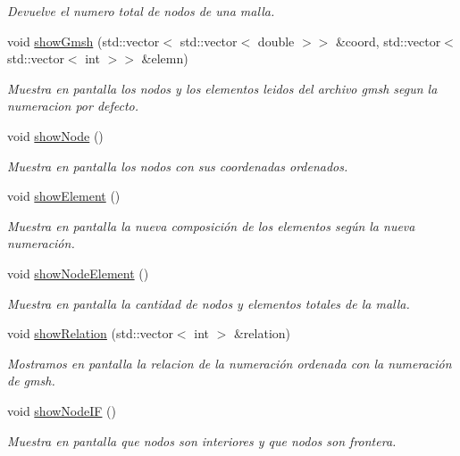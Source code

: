 \begin{DoxyCompactItemize}
\begin{DoxyCompactList}\small\item\em Devuelve el numero total de nodos de una malla. \end{DoxyCompactList}\item 
void \hyperlink{class_mesh_ab390b1e1292e0236b1a3d35c6b738228}{show\+Gmsh} (std\+::vector$<$ std\+::vector$<$ double $>$$>$ \&coord, std\+::vector$<$ std\+::vector$<$ int $>$$>$ \&elemn)
\begin{DoxyCompactList}\small\item\em Muestra en pantalla los nodos y los elementos leidos del archivo gmsh segun la numeracion por defecto. \end{DoxyCompactList}\item 
void \hyperlink{class_mesh_ac5eb1247da3ed432323f1dd8aebbf554}{show\+Node} ()
\begin{DoxyCompactList}\small\item\em Muestra en pantalla los nodos con sus coordenadas ordenados. \end{DoxyCompactList}\item 
void \hyperlink{class_mesh_a0d528aac55b1e4c2a6f5049f9d2cf90d}{show\+Element} ()
\begin{DoxyCompactList}\small\item\em Muestra en pantalla la nueva composición de los elementos según la nueva numeración. \end{DoxyCompactList}\item 
void \hyperlink{class_mesh_ac8d60f17c950dca8ef1a6288860bd3cb}{show\+Node\+Element} ()
\begin{DoxyCompactList}\small\item\em Muestra en pantalla la cantidad de nodos y elementos totales de la malla. \end{DoxyCompactList}\item 
void \hyperlink{class_mesh_a90fd6f1f7a64ff29d1eeee72c22142d2}{show\+Relation} (std\+::vector$<$ int $>$ \&relation)
\begin{DoxyCompactList}\small\item\em Mostramos en pantalla la relacion de la numeración ordenada con la numeración de gmsh. \end{DoxyCompactList}\item 
void \hyperlink{class_mesh_a4de5c225341eb4fc73810d1415eb57da}{show\+Node\+IF} ()
\begin{DoxyCompactList}\small\item\em Muestra en pantalla que nodos son interiores y que nodos son frontera. \end{DoxyCompactList}\item 

\end{DoxyCompactItemize}
